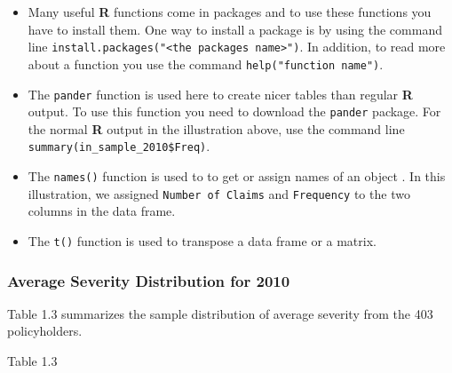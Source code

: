 \documentclass[]{book}
\newenvironment{Shaded}{\begin{snugshade}}{\end{snugshade}}
\newcommand{\KeywordTok}[1]{\textcolor[rgb]{0.13,0.29,0.53}{\textbf{#1}}}
\newcommand{\DecValTok}[1]{\textcolor[rgb]{0.00,0.00,0.81}{#1}}
\newcommand{\StringTok}[1]{\textcolor[rgb]{0.31,0.60,0.02}{#1}}
\newcommand{\OperatorTok}[1]{\textcolor[rgb]{0.81,0.36,0.00}{\textbf{#1}}}
\newcommand{\NormalTok}[1]{#1}
\theoremstyle{definition}
\theoremstyle{definition}
\theoremstyle{definition}
\theoremstyle{remark}
\begin{document}
\begin{itemize}
\item
  Many useful \textbf{R} functions come in packages and to use these
  functions you have to install them. One way to install a package is by
  using the command line
  \texttt{install.packages("\textless{}the\ package\textquotesingle{}s\ name\textgreater{}")}.
  In addition, to read more about a function you use the command
  \texttt{help("function\ name")}.
\item
  The \texttt{pander} function is used here to create nicer tables than
  regular \textbf{R} output. To use this function you need to download
  the \texttt{pander} package. For the normal \textbf{R} output in the
  illustration above, use the command line
  \texttt{summary(in\_sample\_2010\$Freq)}.
\item
  The \texttt{names()} function is used to to get or assign names of an
  object . In this illustration, we assigned \texttt{Number\ of\ Claims}
  and \texttt{Frequency} to the two columns in the data frame.
\item
  The \texttt{t()} function is used to transpose a data frame or a
  matrix.
\end{itemize}

\subsubsection{Average Severity Distribution for
2010}\label{average-severity-distribution-for-2010}

Table 1.3 summarizes the sample distribution of average severity from
the 403 policyholders.

Table 1.3

\begin{Shaded}
\end{Shaded}
\end{document}
